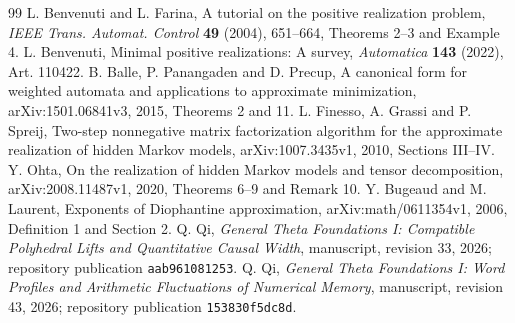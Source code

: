 \begin{thebibliography}{99}
 L. Benvenuti and L. Farina,
A tutorial on the positive realization problem,
\emph{IEEE Trans. Automat. Control} \textbf{49} (2004), 651--664,
Theorems 2--3 and Example 4.
 L. Benvenuti,
Minimal positive realizations: A survey,
\emph{Automatica} \textbf{143} (2022), Art. 110422.
 B. Balle, P. Panangaden and D. Precup,
A canonical form for weighted automata and applications to approximate minimization,
arXiv:1501.06841v3, 2015, Theorems 2 and 11.
 L. Finesso, A. Grassi and P. Spreij,
Two-step nonnegative matrix factorization algorithm for the approximate realization of hidden Markov models,
arXiv:1007.3435v1, 2010, Sections III--IV.
 Y. Ohta,
On the realization of hidden Markov models and tensor decomposition,
arXiv:2008.11487v1, 2020, Theorems 6--9 and Remark 10.
 Y. Bugeaud and M. Laurent,
Exponents of Diophantine approximation,
arXiv:math/0611354v1, 2006, Definition 1 and Section 2.
 Q. Qi,
\emph{General Theta Foundations I: Compatible Polyhedral Lifts and Quantitative Causal Width},
manuscript, revision 33, 2026; repository publication \texttt{aab961081253}.
 Q. Qi,
\emph{General Theta Foundations I: Word Profiles and Arithmetic Fluctuations of Numerical Memory},
manuscript, revision 43, 2026; repository publication \texttt{153830f5dc8d}.
\end{thebibliography}
